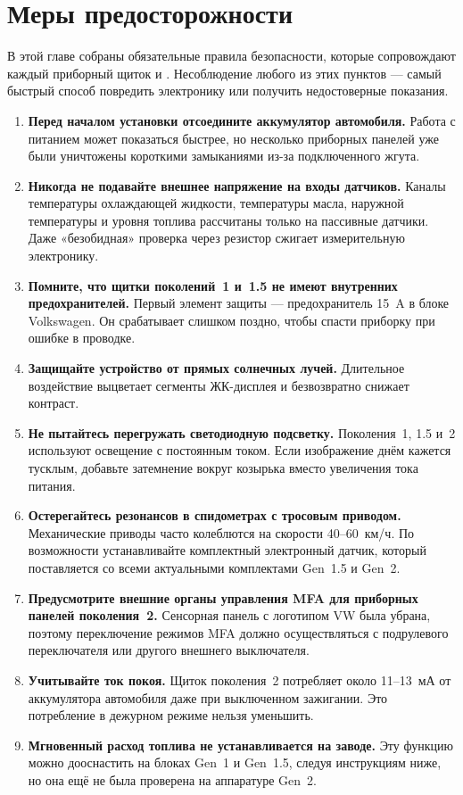 \chapter{Меры предосторожности}\label{ch:precautions-ru}

В этой главе собраны обязательные правила безопасности, которые сопровождают каждый приборный щиток \ReplicaGenOne{} и \ReplicaNextLong{}.
Несоблюдение любого из этих пунктов — самый быстрый способ повредить электронику или получить недостоверные показания.

\begin{enumerate}
    \item \textbf{Перед началом установки отсоедините аккумулятор автомобиля.} Работа с питанием может показаться быстрее, но несколько приборных панелей уже были уничтожены короткими замыканиями из-за подключенного жгута.
    \item \textbf{Никогда не подавайте внешнее напряжение на входы датчиков.} Каналы температуры охлаждающей жидкости, температуры масла, наружной температуры и уровня топлива рассчитаны только на пассивные датчики. Даже «безобидная» проверка через резистор сжигает измерительную электронику.
    \item \textbf{Помните, что щитки поколений~1 и~1.5 не имеют внутренних предохранителей.} Первый элемент защиты — предохранитель 15~A в блоке Volkswagen. Он срабатывает слишком поздно, чтобы спасти приборку при ошибке в проводке.
    \item \textbf{Защищайте устройство от прямых солнечных лучей.} Длительное воздействие выцветает сегменты ЖК-дисплея и безвозвратно снижает контраст.
    \item \textbf{Не пытайтесь перегружать светодиодную подсветку.} Поколения~1, 1.5 и~2 используют освещение с постоянным током. Если изображение днём кажется тусклым, добавьте затемнение вокруг козырька вместо увеличения тока питания.
    \item \textbf{Остерегайтесь резонансов в спидометрах с тросовым приводом.} Механические приводы часто колеблются на скорости 40--60~км/ч. По возможности устанавливайте комплектный электронный датчик, который поставляется со всеми актуальными комплектами Gen~1.5 и Gen~2.
    \item \textbf{Предусмотрите внешние органы управления MFA для приборных панелей поколения~2.} Сенсорная панель с логотипом VW была убрана, поэтому переключение режимов MFA должно осуществляться с подрулевого переключателя или другого внешнего выключателя.
    \item \textbf{Учитывайте ток покоя.} Щиток поколения~2 потребляет около 11--13~мА от аккумулятора автомобиля даже при выключенном зажигании. Это потребление в дежурном режиме нельзя уменьшить.
    \item \textbf{Мгновенный расход топлива не устанавливается на заводе.} Эту функцию можно дооснастить на блоках Gen~1 и Gen~1.5, следуя инструкциям ниже, но она ещё не была проверена на аппаратуре Gen~2.
\end{enumerate}

